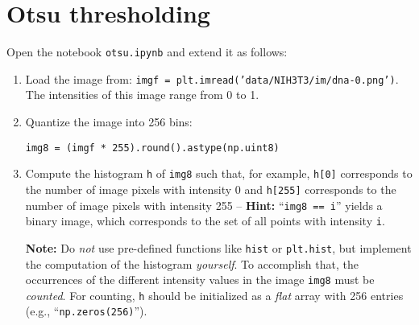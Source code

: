 \documentclass[12pt,a4paper]{article}
\begin{document}
\section{Otsu thresholding}
\label{task:otsu}

Open the notebook \texttt{otsu.ipynb} and extend it as follows:

\begin{enumerate}
    \item Load the image from: \texttt{imgf = plt.imread('data/NIH3T3/im/dna-0.png')}.\\ The intensities of this image range from 0 to 1.
    \item Quantize the image into 256 bins:
\begin{Verbatim}[frame=single]
img8 = (imgf * 255).round().astype(np.uint8)
\end{Verbatim}
    \item Compute the histogram \texttt{h} of \texttt{img8} such that, for example, \texttt{h[0]} corresponds to the number of image pixels with intensity 0 and \texttt{h[255]} corresponds to the number of image pixels with intensity 255 -- \textbf{Hint:} ``\texttt{img8 == i}'' yields a binary image, which corresponds to the set of all points with intensity \texttt{i}.
    
    \textbf{Note:} Do \emph{not} use pre-defined functions like \texttt{hist} or \texttt{plt.hist}, but implement the computation of the histogram \emph{yourself}. To accomplish that, the occurrences of the different intensity values in the image \texttt{img8} must be \emph{counted}. For counting, \texttt{h} should be initialized as a \emph{flat} array with 256 entries (e.g., ``\texttt{np.zeros(256)}'').
    

\end{enumerate}
\end{document}
